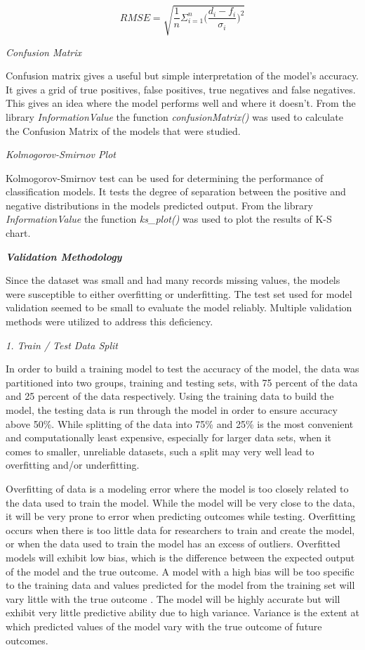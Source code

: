 \documentclass[11pt]{article}
\begin{document}
\begin{equation}
\label{eqn:RMSE}
RMSE = \sqrt{\frac{1}{n}\Sigma_{i=1}^{n}{\Big(\frac{d_i -f_i}{\sigma_i}\Big)^2}}
\end{equation}

{\it Confusion Matrix}

Confusion matrix gives a useful but simple interpretation of the model's accuracy. It gives a grid of true positives, false positives, true negatives and false negatives. This gives an idea where the model performs well and where it doesn't. From the library {\it InformationValue} the function {\it confusionMatrix()} was used to calculate the Confusion Matrix of the models that were studied.

{\it Kolmogorov-Smirnov Plot}

Kolmogorov-Smirnov test can be used for determining the performance of classification models. It tests the degree of separation between the positive and negative distributions in the models predicted output. From the library {\it InformationValue} the function {\it ks\_plot()} was used to plot the results of K-S chart.


{\textbf {\emph{Validation Methodology}}}

Since the dataset was small and had many records missing values, the models were susceptible to either overfitting or underfitting. The test set used for model validation seemed to be small to evaluate the model reliably. Multiple validation methods were utilized to address this deficiency.

{\it 1. Train / Test Data Split}

In order to build a training model to test the accuracy of the model, the data was partitioned into two groups, training and testing sets, with 75 percent of the data and 25 percent of the data respectively. Using the training data to build the model, the testing data is run through the model in order to ensure accuracy above 50\%. While splitting of the data into 75\% and 25\% is the most convenient and computationally least expensive, especially for larger data sets, when it comes to smaller, unreliable datasets, such a split may very well lead to overfitting and/or underfitting.

Overfitting of data is a modeling error where the model is too closely related to the data used to train the model. While the model will be very close to the data, it will be very prone to error when predicting outcomes while testing. Overfitting occurs when there is too little data for researchers to train and create the model, or when the data used to train the model has an excess of outliers. Overfitted models will exhibit low bias, which is the difference between the expected output of the model and the true outcome. A model with a high bias will be too specific to the training data and values predicted for the model from the  training set will vary little with the true outcome \cite{bias-variance}. The model will be highly accurate but will exhibit very little predictive ability due to high variance. Variance is the extent at which predicted values of the model vary with the true outcome of future outcomes. 
\end{document}
